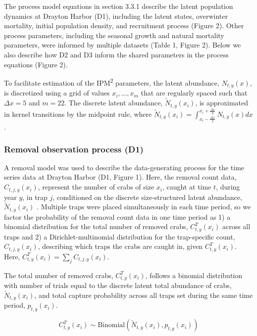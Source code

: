 \documentclass{article}
\begin{document}
The process model equations in section 3.3.1 describe the latent population dynamics at Drayton Harbor (D1), including the latent states, overwinter mortality, initial population density, and recruitment process (Figure 2). Other process parameters, including the seasonal growth and natural mortality parameters, were informed by multiple datasets (Table 1, Figure 2). Below we also describe how D2 and D3 inform the shared parameters in the process equations (Figure 2).

To facilitate estimation of the IPM\textsuperscript{2} parameters, the latent abundance, $N_{t,y}(x)$, is discretized using a grid of values $x_i , \ldots, x_m$ that are regularly spaced such that $\Delta x = 5$ and $m = 22$. The discrete latent abundance, $\tilde{N}_{t,y}(x_i)$, is approximated in kernel transitions by the midpoint rule, where $\tilde{N}_{t,y}(x_i) = \int_{x_i - \frac{\Delta x}{2}}^{x_i + \frac{\Delta x}{2}}N_{t,y}(x)dx$.

\subsubsection*{Removal observation process (D1)}

A removal model was used to describe the data-generating process for the time series data at Drayton Harbor (D1, Figure 1). Here, the removal count data, $C_{t,j,y}(x_i)$, represent the number of crabs of size $x_i$, caught at time $t$, during year $y$, in trap $j$, conditioned on the discrete size-structured latent abundance, $\tilde{N}_{t,y}(x_i)$ \parencite{kery2015modeling}. Multiple traps were placed simultaneously in each time period, so we factor the probability of the removal count data in one time period as 1) a binomial distribution for the total number of removed crabs, $C^T_{t,y}(x_i)$ across all traps and 2) a Dirichlet-multinomial distribution for the trap-specific count, $C_{t,j,y}(x_i)$, describing which traps the crabs are caught in, given $C^T_{t,y}(x_i)$. Here, $C^T_{t,y}(x_i) = \sum_jC_{t,j,y}(x_i)$. 

The total number of removed crabs, $C^T_{t,y}(x_i)$, follows a binomial distribution with number of trials equal to the discrete latent total abundance of crabs, $\tilde{N}_{t,y}(x_i)$, and total capture probability across all traps set during the same time period, $p_{t,y}(x_i)$.

\begin{equation}
C^T_{t,y}(x_i) \sim \text{Binomial}(\tilde{N}_{t,y}(x_i), p_{t,y}(x_i))
\end{equation}
\end{document}
